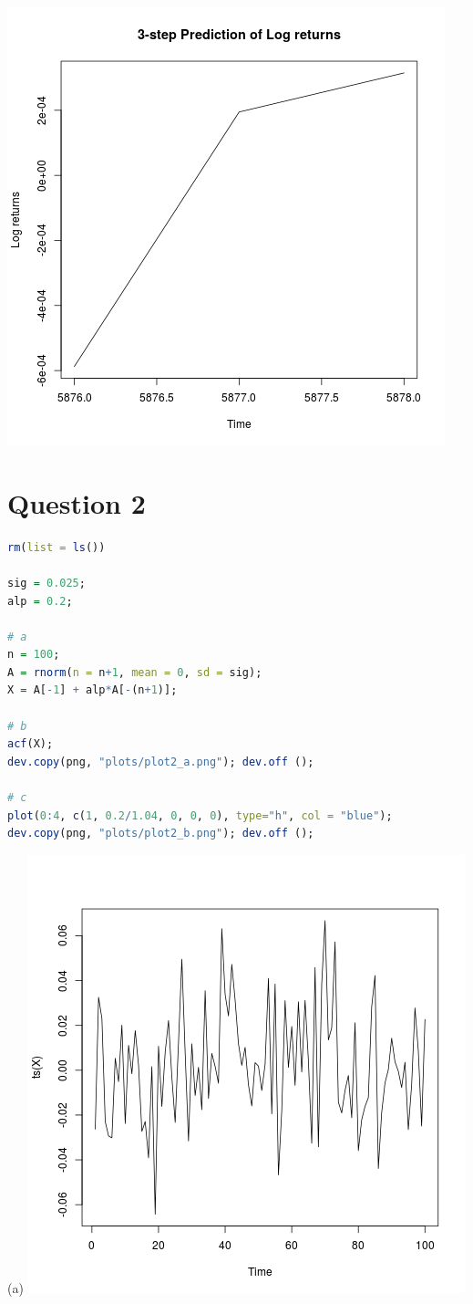 \documentclass{article}
\begin{document}
\includegraphics{"plot1_e"}
\pagebreak


\section{Question 2}


\begin{lstlisting}[language=R]
rm(list = ls())

sig = 0.025;
alp = 0.2;

# a
n = 100;
A = rnorm(n = n+1, mean = 0, sd = sig);
X = A[-1] + alp*A[-(n+1)];

# b
acf(X);
dev.copy(png, "plots/plot2_a.png"); dev.off ();

# c
plot(0:4, c(1, 0.2/1.04, 0, 0, 0), type="h", col = "blue");
dev.copy(png, "plots/plot2_b.png"); dev.off ();
\end{lstlisting}

(a)
\includegraphics{"plot2_a"}
\pagebreak
\end{document}
